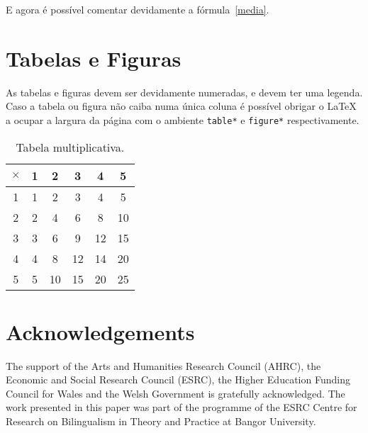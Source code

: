 \documentclass[a4paper, twocolumn, 11pt, twoside]{article}
\begin{document}
E agora é possível comentar devidamente a fórmula~\ref{media}.


\section{Tabelas e Figuras}

As tabelas e figuras devem ser devidamente numeradas, e devem ter uma legenda.
Caso a tabela ou figura não caiba numa única coluna é possível obrigar o \LaTeX{} 
a ocupar a largura da página com o ambiente \verb!table*! e \verb!figure*! respectivamente.

\begin{table}
  \centering
  \begin{tabular}{|c|ccccc|}
    \hline
    $\times$ & 1 & 2 & 3 & 4 & 5 \\
    \hline
     1 & 1 & 2 & 3 & 4 & 5 \\
     2 & 2 & 4 & 6 & 8 & 10 \\
     3 & 3 & 6 & 9 & 12 & 15 \\
     4 & 4 & 8 & 12 & 14 & 20 \\
     5 & 5 & 10 & 15 & 20 & 25 \\
     \hline
  \end{tabular}
  \caption{Tabela multiplicativa.}
\end{table}



\section*{Acknowledgements}

The support of the Arts and Humanities Research Council (AHRC), the Economic and Social Research Council (ESRC), the Higher Education Funding Council for Wales and the Welsh Government is gratefully acknowledged. The work presented in this paper was part of the programme of the ESRC Centre for Research on Bilingualism in Theory and Practice at Bangor University.





\end{document}

